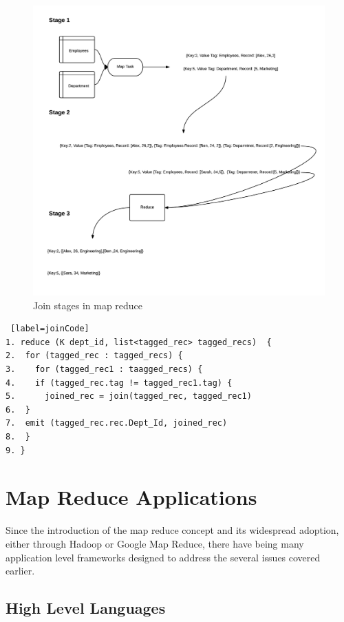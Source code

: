 \documentclass[10pt,twocolumn]{IEEEtran11}
\begin{document}
\begin{figure}[h]
	\centering
	\includegraphics[scale=0.5]{images/mapReduceJoin.png}
	\caption{Join stages in map reduce}
	\label{fig:mrJoin}
\end{figure}

\begin{lstlisting} [label=joinCode]
1. reduce (K dept_id, list<tagged_rec> tagged_recs)  {
2.  for (tagged_rec : tagged_recs) {
3.    for (tagged_rec1 : taagged_recs) {
4.	  if (tagged_rec.tag != tagged_rec1.tag) {
5.	    joined_rec = join(tagged_rec, tagged_rec1)
6.  }
7.  emit (tagged_rec.rec.Dept_Id, joined_rec)
8.  }
9. }
\end{lstlisting}


\section{Map Reduce Applications}

Since the introduction of the map reduce concept and its widespread adoption, either through Hadoop or Google Map Reduce, there have being many application level frameworks designed to address the several issues covered earlier.

\subsection{High Level Languages}
\end{document}
